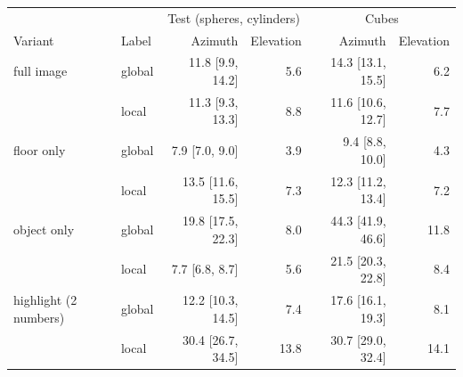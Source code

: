 \begin{tabular}{llrrrr}
\toprule
 & & \multicolumn{2}{c}{Test (spheres, cylinders)} & \multicolumn{2}{c}{Cubes} \\
Variant & Label & Azimuth & Elevation & Azimuth & Elevation \\
\midrule
full image & global & 11.8 [9.9, 14.2] & 5.6 & 14.3 [13.1, 15.5] & 6.2 \\
 & local & 11.3 [9.3, 13.3] & 8.8 & 11.6 [10.6, 12.7] & 7.7 \\
floor only & global & 7.9 [7.0, 9.0] & 3.9 & 9.4 [8.8, 10.0] & 4.3 \\
 & local & 13.5 [11.6, 15.5] & 7.3 & 12.3 [11.2, 13.4] & 7.2 \\
object only & global & 19.8 [17.5, 22.3] & 8.0 & 44.3 [41.9, 46.6] & 11.8 \\
 & local & 7.7 [6.8, 8.7] & 5.6 & 21.5 [20.3, 22.8] & 8.4 \\
highlight (2 numbers) & global & 12.2 [10.3, 14.5] & 7.4 & 17.6 [16.1, 19.3] & 8.1 \\
 & local & 30.4 [26.7, 34.5] & 13.8 & 30.7 [29.0, 32.4] & 14.1 \\
\bottomrule
\end{tabular}
